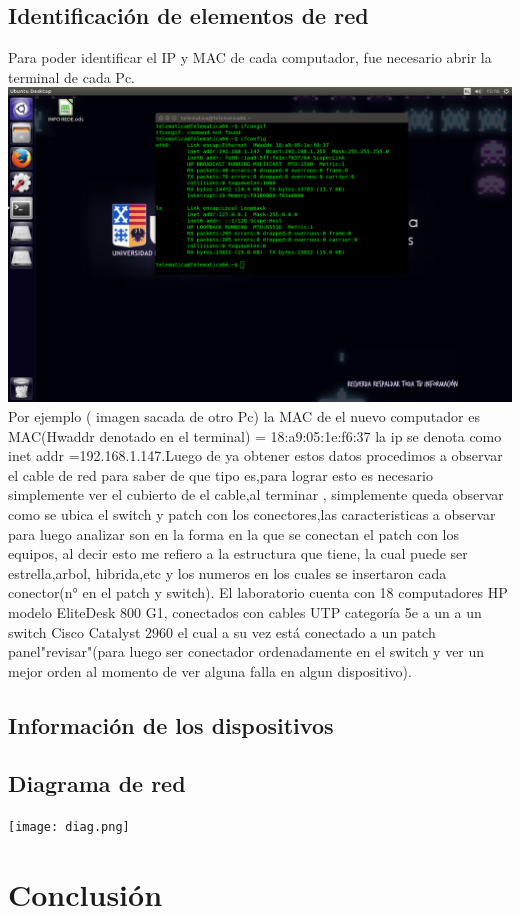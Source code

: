 \documentclass{udpreport}
\begin{document}
\section{Identificación de elementos de red}
Para poder identificar el IP y MAC de cada computador, fue necesario abrir la terminal de cada Pc.
\includegraphics[witdth=\textwidth]{Terminal.png}
Por ejemplo ( imagen sacada de otro Pc) la MAC de el nuevo computador es MAC(Hwaddr denotado en el terminal) = 18:a9:05:1e:f6:37
la ip se denota como inet addr =192.168.1.147.Luego de ya obtener estos datos procedimos a observar el cable de red
para saber de que tipo es,para lograr esto es necesario simplemente ver el cubierto de el cable,al terminar , simplemente queda observar como se ubica el switch y  patch con los conectores,las caracteristicas a observar para luego analizar son en la forma en la que se conectan el patch con los equipos, al decir esto me refiero a la estructura que tiene, la cual puede ser estrella,arbol, hibrida,etc y los numeros en los cuales se insertaron cada conector(n° en el patch y switch). 
El laboratorio cuenta con 18 computadores HP modelo EliteDesk 800 G1, conectados con cables UTP categoría 5e a un a un switch Cisco Catalyst 2960 el cual a su vez está conectado a un patch panel"revisar"(para luego ser conectador ordenadamente en el switch y ver un mejor orden al momento de ver alguna falla en algun dispositivo).
\section{Información de los dispositivos}
\section{Diagrama de red}
\texttt{[image: diag.png]}
\chapter{Conclusión}
\end{document}
